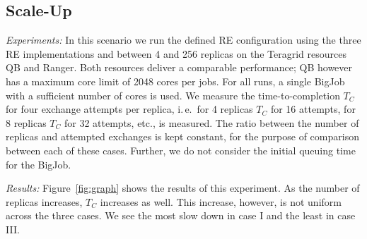 \documentclass{rspublic}
\newcommand{\alnote}[1]{ {\textcolor{blue} { ***andre: #1 }}}
\newcommand{\alnote}[1]{}
\begin{document}
\subsection{Scale-Up}

{\it Experiments: }
In this scenario we run the defined RE configuration using the three RE implementations 
and between 4 and 256 replicas on the Teragrid resources QB and Ranger.
Both resources deliver a comparable performance; QB however has a maximum
core limit of 2048 cores per jobs. For all runs, a single BigJob with a 
sufficient number of cores is used. 
We measure the time-to-completion $T_{C}$ for four 
exchange attempts per replica, i.\,e.\ for 4 replicas $T_{C}$
for 16 attempts, for 8 replicas $T_{C}$ for 32 attempts,
etc., is measured. The ratio between the number of
replicas and attempted exchanges is kept constant, for
the purpose of comparison between each of these cases. Further,
we do not consider the initial queuing time for the BigJob.



{\it Results:} Figure~\ref{fig:graph} shows the results of this 
experiment. As the number of replicas increases, $T_{C}$ increases 
as well. This increase, however, is not uniform across the three cases. 
We see the most slow down in case I and the least in case III.
\end{document}
